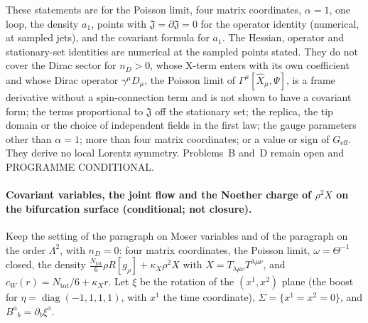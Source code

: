 These statements are for the Poisson limit, four matrix coordinates, \(\alpha=1\), one loop, the density \(a_1\), points with \(\mathfrak J=\partial\mathfrak J=0\) for the operator identity (numerical, at sampled jets), and the covariant formula for \(a_1\). The Hessian, operator and stationary-set identities are numerical at the sampled points stated. They do not cover the Dirac sector for \(n_D>0\), whose X-term enters with its own coefficient and whose Dirac operator \(\gamma^\mu D_\mu\), the Poisson limit of \(\Gamma^\mu[\hat X_\mu,\Psi]\), is a frame derivative without a spin-connection term and is not shown to have a covariant form; the terms proportional to \(\mathfrak J\) off the stationary set; the replica, the tip domain or the choice of independent fields in the first law; the gauge parameters other than \(\alpha=1\); more than four matrix coordinates; or a value or sign of \(G_{\mathrm{eff}}\). They derive no local Lorentz symmetry. Problems~B and~D remain open and PROGRAMME CONDITIONAL.

\paragraph{Covariant variables, the joint flow and the Noether charge of \(\rho^2X\) on the bifurcation surface (conditional; not closure).}
Keep the setting of the paragraph on Moser variables and of the paragraph on the order \(\Lambda^2\), with \(n_D=0\): four matrix coordinates, the Poisson limit, \(\omega=\Theta^{-1}\) closed, the density \(\tfrac{N_{\mathrm{tot}}}6\rho R[g_\rho]+\kappa_X\rho^2X\) with \(X=T_{\lambda\mu\nu}T^{\lambda\mu\nu}\), and \(c_W(r)=N_{\mathrm{tot}}/6+\kappa_Xr\). Let \(\xi\) be the rotation of the \((x^1,x^2)\) plane (the boost for \(\eta=\operatorname{diag}(-1,1,1,1)\), with \(x^1\) the time coordinate), \(\Sigma=\{x^1=x^2=0\}\), and \(B^a{}_b=\partial_b\xi^a\).

